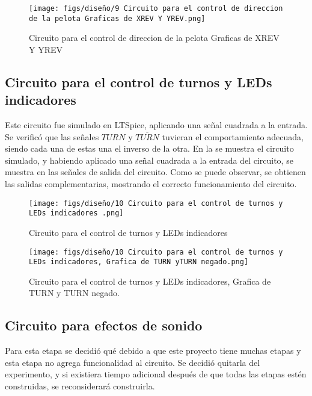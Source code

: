 \begin{figure}[H]
    \centering
    \texttt{[image: figs/diseño/9 Circuito para el control de direccion de la pelota Graficas de XREV Y YREV.png]}
    \caption{Circuito para el control de direccion de la pelota Graficas de XREV Y YREV}
    \label{GraficaDirecPelota}
\end{figure}
\newpage

\subsection{Circuito para el control de turnos y LEDs indicadores}
Este circuito fue simulado en LTSpice, aplicando una señal cuadrada a la entrada.
Se verificó que las señales $TURN$ y $\overline{TURN}$ tuvieran el comportamiento adecuada, siendo cada una de estas una el inverso de la otra.
En la  se muestra el circuito simulado, y habiendo aplicado una señal cuadrada a la entrada del circuito, se muestra en  las señales de salida del circuito.
Como se puede observar, se obtienen las salidas complementarias, mostrando el correcto funcionamiento del circuito. 

\begin{figure}[H]
    \centering
    \texttt{[image: figs/diseño/10 Circuito para el control de turnos y LEDs indicadores .png]}
    \caption{Circuito para el control de turnos y LEDs indicadores}
    \label{ControlTurnosLed}
\end{figure}

\begin{figure}[H]
    \centering
    \texttt{[image: figs/diseño/10 Circuito para el control de turnos y LEDs indicadores, Grafica de TURN yTURN negado.png]}
    \caption{Circuito para el control de turnos y LEDs indicadores, Grafica de TURN y TURN negado.}
    \label{GraficaControlTurnosLed}
\end{figure}


\subsection{Circuito para efectos de sonido}

Para esta etapa se decidió qué debido a que este proyecto tiene muchas etapas y esta etapa no agrega funcionalidad al circuito. Se decidió quitarla del experimento, y si existiera tiempo adicional después de que todas las etapas estén construidas, se reconsiderará construirla.